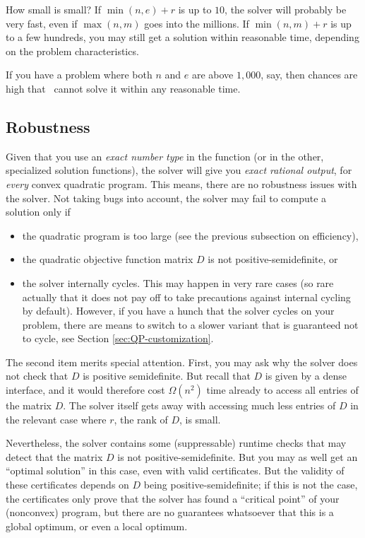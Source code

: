 How small is small? If $\min(n,e)+r$ is up to $10$, the solver will
probably be very fast, even if $\max(n,m)$ goes into the millions. 
If $\min(n,m)+r$ is up to a few hundreds, you may still get a solution 
within reasonable time, depending on the problem characteristics.

If you have a problem where both $n$ and $e$ are above
$1,000$, say, then chances are high that \cgal\ cannot solve it
within any reasonable time.

\subsection{Robustness}
\label{sec:QP-robustness}
Given that you use an \emph{exact number type} in the function
 (or in the other, specialized 
solution functions),  the solver
will give you \emph{exact rational output}, for \emph{every}
convex quadratic program. This means, there are no robustness
issues with the solver. Not taking bugs into account, the solver 
may fail to compute a solution only if
\begin{itemize}
\item the quadratic program is too large (see the previous subsection 
on efficiency), 
\item the quadratic objective function matrix $D$ is not 
positive-semidefinite, or
\item the solver internally cycles. This may happen in very rare
cases (so rare actually that it does not pay off to take
precautions against internal cycling by default). However, if
you have a hunch that the solver cycles on your problem,
there are means to switch to a slower variant that is guaranteed
not to cycle, see Section \ref{sec:QP-customization}.
\end{itemize}

The second item merits special attention. First, you may ask why the
solver does not check that $D$ is positive semidefinite. But recall
that $D$ is given by a dense interface, and it would therefore cost
$\Omega(n^2)$ time already to access all entries of the matrix $D$.
The solver itself gets away with accessing much less entries of 
$D$ in the relevant case where $r$, the rank of $D$, is small.

Nevertheless, the solver contains some (suppressable) runtime checks
that may detect that the matrix $D$ is not positive-semidefinite. But
you may as well get an ``optimal solution'' in this case, even with
valid certificates. But the validity of these certificates depends on
$D$ being positive-semidefinite; if this is not the case, the
certificates only prove that the solver has found a ``critical point'' of
your (nonconvex) program, but there are no guarantees whatsoever that
this is a global optimum, or even a local optimum.


